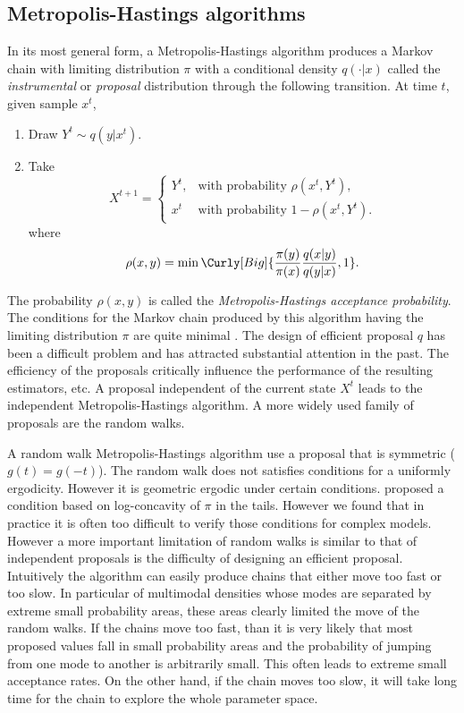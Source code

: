 \subsection{Metropolis-Hastings algorithms}
\label{sub:Metropolis-Hastings algorithms}

In its most general form, a Metropolis-Hastings algorithm produces a Markov
chain with limiting distribution $\pi$ with a conditional density $q(\cdot|x)$
called the \emph{instrumental} or \emph{proposal} distribution through the
following transition. At time $t$, given sample $x^t$,
\begin{enumerate}
  \item Draw $Y^t \sim q(y|x^t)$.
  \item Take
    \begin{equation*}
      X^{t+1} =
      \begin{cases}
        Y^t, &\text{with probability } \rho(x^t,Y^t),\\
        x^t  &\text{with probability } 1 - \rho(x^t,Y^t).
      \end{cases}
    \end{equation*}
    where
    \begin{equation}
      \rho(x,y) =
      \min\Curly[Big]{\frac{\pi(y)}{\pi(x)}\frac{q(x|y)}{q(y|x)},1}.
    \end{equation}
\end{enumerate}
The probability $\rho(x,y)$ is called the \emph{Metropolis-Hastings acceptance
  probability}. The conditions for the Markov chain produced by this algorithm
having the limiting distribution $\pi$ are quite minimal
\parencite[see][chap.~7]{Robert:2004tn}. The design of efficient proposal $q$
has been a difficult problem and has attracted substantial attention in the
past. The efficiency of the proposals critically influence the performance of
the resulting estimators, etc. A proposal independent of the current state
$X^t$ leads to the independent Metropolis-Hastings algorithm. A more widely
used family of proposals are the random walks.

A random walk Metropolis-Hastings algorithm use a proposal that is symmetric
($g(t) = g(-t)$). The random walk does not satisfies conditions for a
uniformly ergodicity. However it is geometric ergodic under certain
conditions. \textcite{Mengersen:1996th} proposed a condition based on
log-concavity of $\pi$ in the tails. However we found that in practice it is
often too difficult to verify those conditions for complex models. However a
more important limitation of random walks is similar to that of independent
proposals is the difficulty of designing an efficient proposal.  Intuitively
the algorithm can easily produce chains that either move too fast or too slow.
In particular of multimodal densities whose modes are separated by extreme
small probability areas, these areas clearly limited the move of the random
walks. If the chains move too fast, than it is very likely that most proposed
values fall in small probability areas and the probability of jumping from one
mode to another is arbitrarily small. This often leads to extreme small
acceptance rates. On the other hand, if the chain moves too slow, it will take
long time for the chain to explore the whole parameter space.

